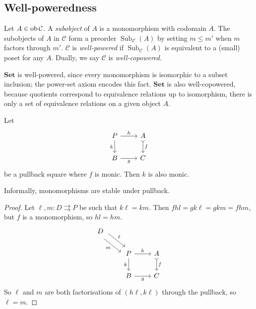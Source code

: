 \subsection{Well-poweredness}
\begin{definition}
    Let \( A \in \operatorname{ob} \mathcal C \).
    A \emph{subobject} of \( A \) is a monomorphism with codomain \( A \).
    The subobjects of \( A \) in \( \mathcal C \) form a preorder \( \operatorname{Sub}_{\mathcal C}(A) \) by setting \( m \leq m' \) when \( m \) factors through \( m' \).
    \( \mathcal C \) is \emph{well-powered} if \( \operatorname{Sub}_{\mathcal C}(A) \) is equivalent to a (small) poset for any \( A \).
    Dually, we say \( \mathcal C \) is \emph{well-copowered}.
\end{definition}
\begin{example}
    \( \mathbf{Set} \) is well-powered, since every monomorphism is isomorphic to a subset inclusion; the power-set axiom encodes this fact.
    \( \mathbf{Set} \) is also well-copowered, because quotients correspond to equivalence relations up to isomorphism, there is only a set of equivalence relations on a given object \( A \).
\end{example}
\begin{lemma}
    Let
\[\begin{tikzcd}
	P & A \\
	B & C
	\arrow["h", from=1-1, to=1-2]
	\arrow["f", tail, from=1-2, to=2-2]
	\arrow["k"', from=1-1, to=2-1]
	\arrow["g"', from=2-1, to=2-2]
\end{tikzcd}\]
    be a pullback square where \( f \) is monic.
    Then \( k \) is also monic.
\end{lemma}
Informally, monomorphisms are stable under pullback.
\begin{proof}
    Let \( \ell, m : D \rightrightarrows P \) be such that \( k\ell = km \).
    Then \( fhl = gk\ell = gkm = fhm \), but \( f \) is a monomorphism, so \( hl = hm \).
\[\begin{tikzcd}
	D \\
	& P & A \\
	& B & C
	\arrow["h", from=2-2, to=2-3]
	\arrow["f", tail, from=2-3, to=3-3]
	\arrow["k"', from=2-2, to=3-2]
	\arrow["g"', from=3-2, to=3-3]
	\arrow["\ell", shift left=2, from=1-1, to=2-2]
	\arrow["m"', shift right=2, from=1-1, to=2-2]
\end{tikzcd}\]
    So \( \ell \) and \( m \) are both factorisations of \( (h\ell, k\ell) \) through the pullback, so \( \ell = m \).
\end{proof}

